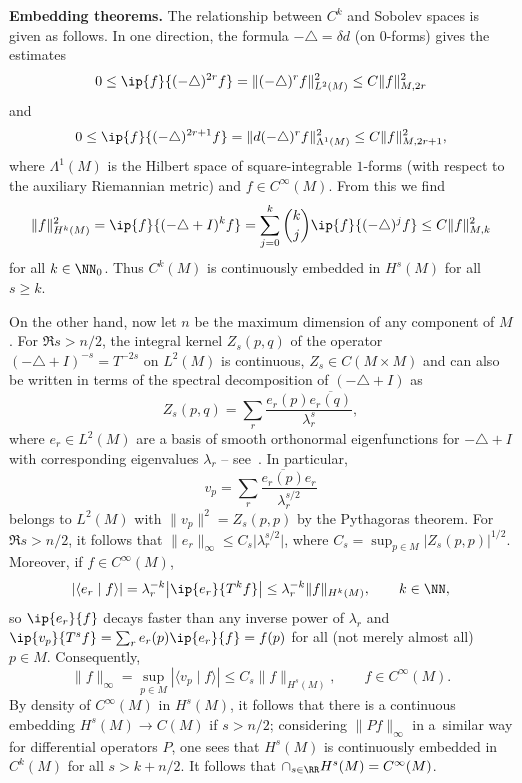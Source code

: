  {\bf Embedding theorems.}
 The relationship between $C^k$ and Sobolev spaces is given as follows. In one direction, the formula $-\triangle=\delta d$ (on $0$-forms) gives the estimates
 \begin{equation*}
 	0\le \ip{f}{(-\triangle)^{2r}f} = \| (-\triangle)^r f\|^2_{L^2(M)}\le C\|f\|_{M,2r}^2
 \end{equation*}
 and
 \begin{equation*}
 	0\le \ip{f}{(-\triangle)^{2r+1}f} = \| d(-\triangle)^r f\|^2_{\Lambda^1(M)}\le C\|f\|_{M,2r+1}^2 ,
 \end{equation*}
 where $\Lambda^1(M)$ is the Hilbert space of square-integrable $1$-forms (with respect to the auxiliary Riemannian metric) and $f\in C^\infty(M)$.
 From this we find
 \begin{equation*}
 	\|f\|_{H^k(M)}^2 = \ip{f}{(-\triangle+I)^k f} = \sum_{j=0}^k \binom{k}{j} \ip{f}{(-\triangle)^{j}f} \le C \|f\|_{M,k}^2
 \end{equation*}
 for all $k\in \NN_0$. Thus $C^k(M)$ is continuously embedded in $H^s(M)$ for all $s\ge k$.

 On the other hand, now let $n$ be the maximum dimension of any component of $M$.
 For $\Re s>n/2$, the integral kernel $Z_s(p,q)$ of the operator $(-\triangle+I)^{-s}=T^{-2s}$ on $L^2(M)$ is continuous, $Z_s\in C(M\times M)$ and can also be written
 in terms of the spectral decomposition of
 $(-\triangle+I)$ as
 \begin{equation*}
 	Z_s(p,q) = \sum_{r} \frac{e_r(p)\overline{e_r(q)}}{\lambda_r^{s}},
 \end{equation*}
 where $e_r\in L^2(M)$ are a basis of smooth orthonormal eigenfunctions for $-\triangle+I$ with corresponding eigenvalues $\lambda_r$ -- see~\cite{Seeley:1967}. In particular,
 \begin{equation*}
 	v_p = \sum_{r} \frac{\overline{e_r(p)}e_r}{\lambda_r^{s/2}}
 \end{equation*}
 belongs to $L^2(M)$ with $\|v_p\|^2 = Z_s(p,p)$ by the Pythagoras theorem.
 For $\Re s>n/2$, it follows that $\|e_r\|_\infty \le C_s\big|\lambda_r^{s/2}\big|$, where $C_s=\sup_{p\in M}|Z_s(p,p)|^{1/2}$. Moreover, if $f\in C^\infty(M)$,
 \begin{equation*}
 	|\langle e_r \mid f \rangle|=\lambda_r^{-k}\big|\ip{e_r}{T^k f}\big|\le \lambda^{-k}_r\|f\|_{H^k(M)},\qquad k\in\NN,
 \end{equation*}
 so $\ip{e_r}{f}$ decays faster than any inverse power of $\lambda_r$ and
 $\ip{v_p}{T^s f} = \sum_r e_r(p)\ip{e_r}{f}= f(p)$ for all (not merely almost all) $p\in M$. Consequently,
 \begin{equation*}
 	\|f\|_\infty =\sup_{p\in M} |\langle v_p \mid f \rangle|\le C_s \|f\|_{H^s(M)}, \qquad f\in C^\infty(M).
 \end{equation*}
 By density of $C^\infty(M)$ in $H^s(M)$, it follows
 that there is a continuous embedding $H^s(M)\to C(M)$ if $s>n/2$; considering $\|Pf\|_\infty$ in a~similar way for differential operators $P$, one sees that $H^s(M)$ is continuously embedded in $C^k(M)$ for all $s>k+n/2$. It follows that $\cap_{s\in\RR} H^s(M)=C^\infty(M)$.


